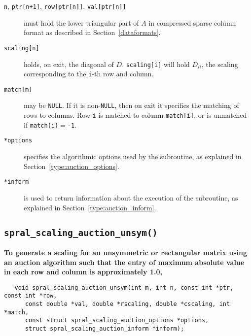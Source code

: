 \begin{description}

\item[\texttt{n}, \texttt{ptr[n+1]}, \texttt{row[ptr[n]]}, \texttt{val[ptr[n]]}] must hold the lower triangular part of $A$ in compressed sparse column format as described in Section~\ref{dataformats}.

\item[\texttt{scaling[n]}] holds, on exit, the diagonal of $D$.
\texttt{scaling[i]} will hold $D_{ii}$, the scaling corresponding to the
\texttt{i}-th row and column.

\item[\texttt{match[m]}] may be \texttt{NULL}. If it is non-\texttt{NULL},
then on exit it specifies the matching of rows to columns.
Row \texttt{i} is matched to column \texttt{match[i]}, or is unmatched
if \texttt{match(i)}$=$\texttt{-1}.

\item[\texttt{*options}] specifies the algorithmic options used by the subroutine, as explained in Section~\ref{type:auction_options}.

\item[\texttt{*inform}] is used to return information about the execution of the subroutine, as explained in Section~\ref{type:auction_inform}.


\end{description}

\subsection{\texttt{spral\_scaling\_auction\_unsym()}}

\textbf{\noindent
   To generate a scaling for an unsymmetric or rectangular matrix using an auction algorithm such that the entry of maximum absolute value in each row and column is approximately 1.0,
}
\vspace*{-0.1cm}
\begin{verbatim}
   void spral_scaling_auction_unsym(int m, int n, const int *ptr, const int *row,
      const double *val, double *rscaling, double *cscaling, int *match,
      const struct spral_scaling_auction_options *options,
      struct spral_scaling_auction_inform *inform);
\end{verbatim}

